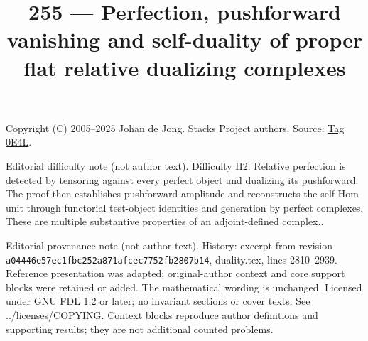 \documentclass{amsart}
\theoremstyle{plain}
\theoremstyle{definition}
\theoremstyle{remark}
\numberwithin{equation}{subsection}
\begin{document}
\title[Stacks Project, Tag 0E4L]{255 --- Perfection, pushforward vanishing and self-duality of proper flat relative dualizing complexes}
\maketitle
\noindent Copyright (C) 2005--2025 Johan de Jong. Stacks Project authors. Source: \href{https://stacks.math.columbia.edu/tag/0E4L}{Tag 0E4L}.

\noindent Editorial difficulty note (not author text). Difficulty H2: Relative perfection is detected by tensoring against every perfect object and dualizing its pushforward. The proof then establishes pushforward amplitude and reconstructs the self-Hom unit through functorial test-object identities and generation by perfect complexes. These are multiple substantive properties of an adjoint-defined complex..

\noindent Editorial provenance note (not author text). History: excerpt from revision \texttt{a0444\allowbreak 6e57e\allowbreak c1fbc\allowbreak 252a8\allowbreak 71afc\allowbreak ec775\allowbreak 2fb28\allowbreak 07b14}, duality.tex, lines 2810--2939. Reference presentation was adapted; original-author context and core support blocks were retained or added. The mathematical wording is unchanged. Licensed under GNU FDL 1.2 or later; no invariant sections or cover texts. See ../licenses/COPYING. Context blocks reproduce author definitions and supporting results; they are not additional counted problems.
\end{document}
